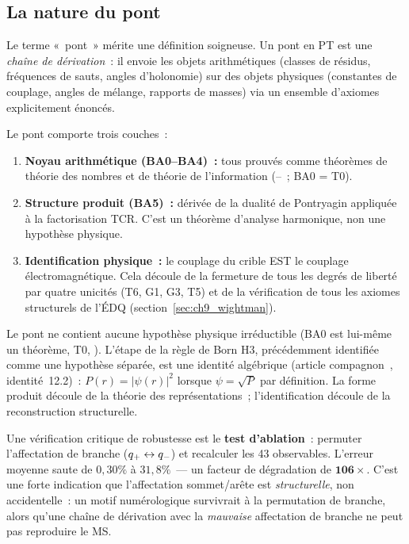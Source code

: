 \documentclass[12pt,a4paper]{article}
\begin{document}
\subsection{La nature du pont}
\label{sec:ch9_intuition}

Le terme «~pont~» mérite une définition soigneuse. Un pont en PT
est une \emph{chaîne de dérivation}~: il envoie les objets
arithmétiques (classes de résidus, fréquences de sauts, angles
d'holonomie) sur des objets physiques (constantes de couplage,
angles de mélange, rapports de masses) via un ensemble d'axiomes
explicitement énoncés.

Le pont comporte trois couches~:
\begin{enumerate}[nosep]
\item \textbf{Noyau arithmétique (BA0--BA4)~:} tous prouvés comme
  théorèmes de théorie des nombres et de théorie de l'information
  (\cite{companion_M1}--\cite{companion_M3}~; BA0 = T0).
\item \textbf{Structure produit (BA5)~:} dérivée de la dualité de
  Pontryagin appliquée à la factorisation TCR. C'est un théorème
  d'analyse harmonique, non une hypothèse physique.
\item \textbf{Identification physique~:} le couplage du crible EST
  le couplage électromagnétique. Cela découle de la fermeture de
  tous les degrés de liberté par quatre unicités (T6, G1, G3, T5)
  et de la vérification de tous les axiomes structurels de l'ÉDQ
  (section~\ref{sec:ch9_wightman}).
\end{enumerate}

Le pont ne contient aucune hypothèse physique irréductible (BA0 est
lui-même un théorème, T0, \cite{companion_M3}).
L'étape de la règle de Born H3, précédemment identifiée comme une
hypothèse séparée, est une identité algébrique (article
compagnon~\cite{companion_physics}, identité~12.2)~:
$P(r) = |\psi(r)|^2$ lorsque $\psi = \sqrt{P}$ par définition. La
forme produit découle de la théorie des représentations~;
l'identification découle de la reconstruction structurelle.

\begin{remarque}
\label{rem:ablation}
Une vérification critique de robustesse est le \textbf{test
d'ablation}~: permuter l'affectation de branche
($q_{+} \leftrightarrow q_{-}$) et recalculer les 43
observables. L'erreur moyenne saute de $0{,}30\%$ à $31{,}8\%$~---
un facteur de dégradation de $\mathbf{106\times}$. C'est une forte
indication que l'affectation sommet/arête est \emph{structurelle},
non accidentelle~: un motif numérologique survivrait à la permutation
de branche, alors qu'une chaîne de dérivation avec la \emph{mauvaise}
affectation de branche ne peut pas reproduire le MS.
\end{remarque}
\end{document}
